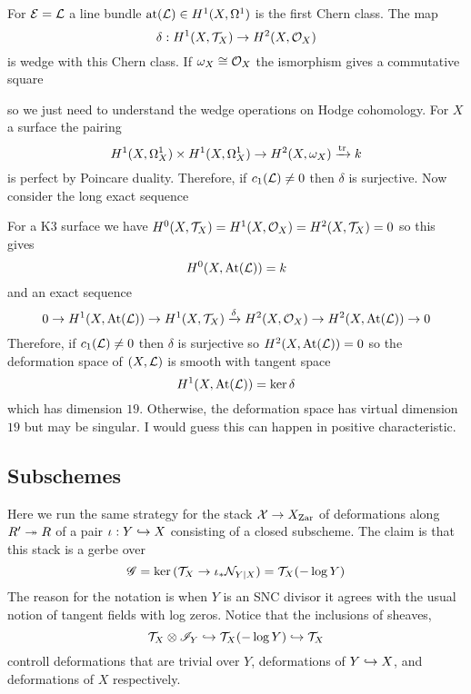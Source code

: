 \documentclass[12pt]{article}
\newcommand{\cO}{\mathcal{O}}
\newcommand{\Zar}{\mathrm{Zar}}
\begin{document}
\begin{example}
For $\mathcal{E} = \mathcal{L}$ a line bundle $\mathrm{at}(\mathcal{L}) \in H^1(X, \Omega^1)$ is the first Chern class. The map
\[ \delta : H^1(X, \mathcal{T}_X) \to H^2(X, \mathcal{O}_{X}) \]
is wedge with this Chern class. If $\omega_X \cong \mathcal{O}_{X}$ the ismorphism gives a commutative square 
\begin{center}
\end{center}
so we just need to understand the wedge operations on Hodge cohomology. For $X$ a surface the pairing
\[ H^1(X, \Omega_X^1) \times H^1(X, \Omega_X^1) \to H^2(X, \omega_X) \xrightarrow{\operatorname{\mathrm{tr}}} k \]
is perfect by Poincare duality. Therefore, if $c_1(\mathcal{L}) \neq 0$ then $\delta$ is surjective. Now consider the long exact sequence
\begin{center}
\end{center}
For a K3 surface we have $H^0(X, \mathcal{T}_X) = H^1(X, \mathcal{O}_{X}) = H^2(X, \mathcal{T}_X) = 0$ so this gives
\[ H^0(X, \mathrm{At}(\mathcal{L})) = k \]
and an exact sequence
\[ 0 \to H^1(X, \At(\L)) \to H^1(X, \T_X) \xrightarrow{\delta} H^2(X, \cO_X) \to H^2(X, \At(\L)) \to 0 \]
Therefore, if $c_1(\mathcal{L}) \neq 0$ then $\delta$ is surjective so $H^2(X, \mathrm{At}(\mathcal{L})) = 0$ so the deformation space of $(X, \mathcal{L})$ is smooth with tangent space
\[ H^1(X, \mathrm{At}(\mathcal{L})) = \ker{\delta} \]
which has dimension $19$. Otherwise, the deformation space has virtual dimension $19$ but may be singular. I would guess this can happen in positive characteristic. 
\end{example}

\subsection{Subschemes}

Here we run the same strategy for the stack $\X \to X_{\Zar}$ of deformations along $R' \twoheadrightarrow R$ of a pair $\iota : Y \hookrightarrow X$ consisting of a closed subscheme. The claim is that this stack is a gerbe over
\[ \mathscr{G} = \ker{(\mathcal{T}_X \to \iota_* \mathcal{N}_{Y|X})} = \mathcal{T}_X(-\log{Y}) \]
The reason for the notation is when $Y$ is an SNC divisor it agrees with the usual notion of tangent fields with log zeros. Notice that the inclusions of sheaves,
\[ \mathcal{T}_X \otimes \mathscr{I}_Y \hookrightarrow \mathcal{T}_X(-\log{Y}) \hookrightarrow \mathcal{T}_X \]
controll deformations that are trivial over $Y$, deformations of $Y \hookrightarrow X$, and deformations of $X$ respectively.  
\end{document}
